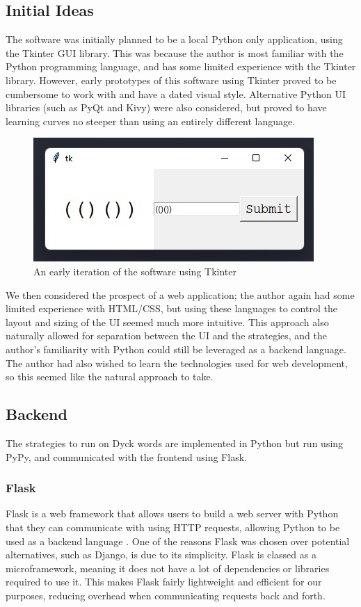 \subsection{Initial Ideas}
 The software was initially planned to be a local Python only application, using the Tkinter GUI library. This was because the author is most familiar with the Python programming language, and has some limited experience with the Tkinter library. However, early prototypes of this software using Tkinter proved to be cumbersome to work with and have a dated visual style. Alternative Python UI libraries (such as PyQt and Kivy) were also considered, but proved to have learning curves no steeper than using an entirely different language.
\begin{figure}[H]
    \centering
    \includegraphics[scale = 0.7]{./images/tkinter-gui.jpeg}
    \caption{An early iteration of the software using Tkinter}
\end{figure}
\noindent We then considered the prospect of a web application; the author again had some limited experience with HTML/CSS, but using these languages to control the layout and sizing of the UI seemed much more intuitive. This approach also naturally allowed for separation between the UI and the strategies, and the author's familiarity with Python could still be leveraged as a backend language. The author had also wished to learn the technologies used for web development, so this seemed like the natural approach to take.

\subsection{Backend}
The strategies to run on Dyck words are implemented in Python but run using PyPy, and communicated with the frontend using Flask.

\subsubsection{Flask}
Flask is a web framework that allows users to build a web server with Python that they can communicate with using HTTP requests, allowing Python to be used as a backend language \cite{whatisFlask}. One of the reasons Flask was chosen over potential alternatives, such as Django, is due to its simplicity. Flask is classed as a microframework, meaning it does not have a lot of dependencies or libraries required to use it. This makes Flask fairly lightweight and efficient for our purposes, reducing overhead when communicating requests back and forth. 

